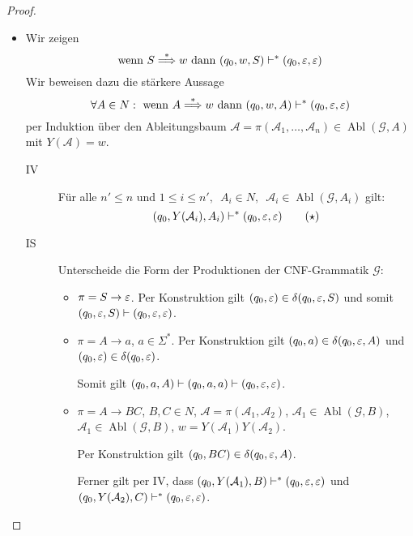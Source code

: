 \begin{proof}
\begin{itemize}
  \begin{itemize}
  \item Wir zeigen
    \begin{displaymath}
      \text{wenn } S \stackrel{*}{\Longrightarrow} w \text{ dann } (q_0, w, S) \vdash^* (q_0, \varepsilon, \varepsilon)
    \end{displaymath}
    Wir beweisen dazu die stärkere Aussage
    \begin{displaymath}
      \forall A \in N: \text{ wenn } A \stackrel{*}{\Longrightarrow} w\text{ dann } (q_0, w, A) \vdash^* (q_0, \varepsilon, \varepsilon)
    \end{displaymath}
    per Induktion über den Ableitungsbaum $\mathcal{A} = \pi(\mathcal{A}_1, \ldots, \mathcal{A}_n)\in \operatorname{Abl}(\mathcal{G}, A)$ mit $Y(\mathcal{A}) = w$.
    \begin{description}
    \item[IV] Für alle $n' \le n$ und $1 \le i \le n',\enspace A_i \in N,\enspace \mathcal{A}_i \in \operatorname{Abl}(\mathcal{G}, A_i)$ gilt:
      \begin{equation}
      \label{eq:pda-step-base}
      (q_0, Y(\mathcal{A}_i), A_i) \vdash^* (q_0, \varepsilon, \varepsilon) \tag{$\star$}
    \end{equation}
    \item[IS] Unterscheide die Form der Produktionen der CNF-Grammatik $\mathcal{G}$:
      \begin{itemize}
      \item $\pi = S \to \varepsilon$.
        Per Konstruktion gilt $(q_0, \varepsilon) \in \delta(q_0, \varepsilon, S)$ und somit $(q_0, \varepsilon, S) \vdash (q_0, \varepsilon, \varepsilon)$.
      \item $\pi = A \to a$, $a \in \Sigma^*$.
        Per Konstruktion gilt $(q_0, a) \in \delta(q_0, \varepsilon, A)$ und $(q_0, \varepsilon) \in \delta(q_0, \varepsilon)$.

        Somit gilt $(q_0, a, A) \vdash (q_0, a, a) \vdash (q_0, \varepsilon, \varepsilon)$.
      \item $\pi = A \to BC$, $B,C \in N$, $\mathcal{A} = \pi(\mathcal{A}_1, \mathcal{A}_2)$, $\mathcal{A}_1 \in \operatorname{Abl}(\mathcal{G}, B)$, $\mathcal{A}_1 \in \operatorname{Abl}(\mathcal{G}, B)$, $w = Y(\mathcal{A}_1)Y(\mathcal{A}_2)$.

        Per Konstruktion gilt $(q_0, BC) \in \delta(q_0, \varepsilon, A)$. 

        Ferner gilt per IV, dass $(q_0, Y(\mathcal{A}_1), B) \vdash^* (q_0, \varepsilon, \varepsilon)$ und $(q_0, Y(\mathcal{A}_2), C) \vdash^* (q_0, \varepsilon, \varepsilon)$.


\end{itemize}
\end{description}
\end{itemize}
\end{itemize}
\end{proof}
